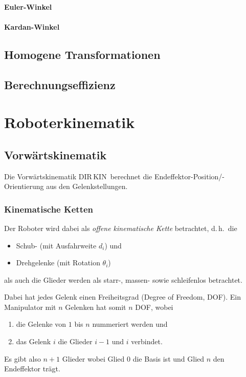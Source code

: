 \documentclass[a4paper, 11pt, accentcolor = tud3b]{tudreport}
\renewcommand{\dh}{d.\,h.~}
\newcommand{\DIRKIN}{DIR\,KIN~}
\begin{document}
				\subsubsection{Euler-Winkel} %

				\subsubsection{Kardan-Winkel} %

		\section{Homogene Transformationen} %

		\section{Berechnungseffizienz} %

	\chapter{Roboterkinematik}
		\section{Vorwärtskinematik}
			Die Vorwärtskinematik \DIRKIN berechnet die Endeffektor-Position/-Orientierung aus den Gelenkstellungen.
		
			\subsection{Kinematische Ketten}
				Der Roboter wird dabei als \emph{offene kinematische Kette} betrachtet, \dh die
				\begin{itemize}
					\item Schub- (mit Ausfahrweite \( d_i \)) und
					\item Drehgelenke (mit Rotation \( \theta_i \))
				\end{itemize}
				als auch die Glieder werden als starr-, massen- sowie schleifenlos betrachtet.
				
				Dabei hat jedes Gelenk einen Freiheitsgrad (Degree of Freedom, DOF). Ein Manipulator mit \(n\) Gelenken hat somit \(n\) DOF, wobei
				\begin{enumerate}
					\item die Gelenke von \(1\) bis \(n\) nummeriert werden und
					\item das Gelenk \(i\) die Glieder \(i - 1\) und \(i\) verbindet.
				\end{enumerate}
				Es gibt also \(n + 1\) Glieder wobei Glied \(0\) die Basis ist und Glied \(n\) den Endeffektor trägt.
\end{document}
